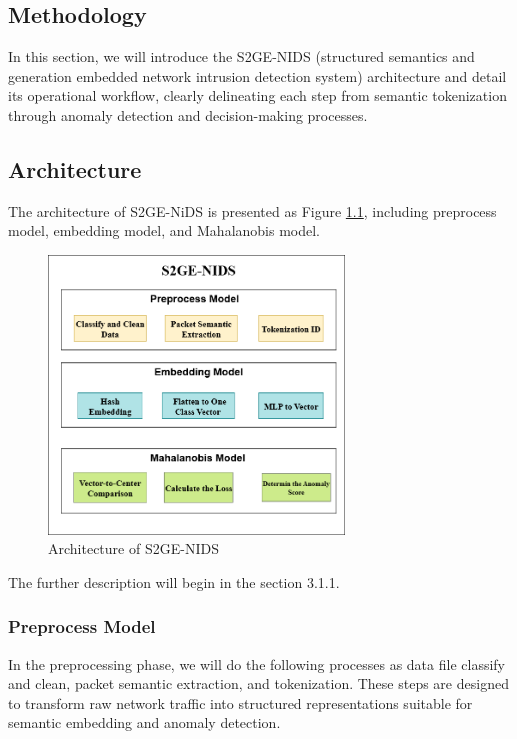 \begin{ZhChapter}

    \chapter{Methodology}
    In this section, we will introduce the S2GE-NIDS (structured semantics and generation embedded network intrusion detection system) architecture and detail its operational workflow, clearly delineating each step from semantic tokenization through anomaly detection and decision-making processes.
    \section{Architecture} %
    The architecture of S2GE-NiDS is presented as Figure \ref{fig:Architecture}, including preprocess model, embedding model, and Mahalanobis model.

    \begin{figure}[htbp]
        \centering
        \includegraphics[width = 0.7\textwidth]{image/architecture.png}
        \caption{Architecture of S2GE-NIDS}
        \label{fig:Architecture}
    \end{figure}

    The further description will begin in the section 3.1.1.

    \subsection{Preprocess Model}
    In the preprocessing phase, we will do the following processes as data file classify and clean, packet semantic extraction, and tokenization. These steps are designed to transform raw network traffic into structured representations suitable for semantic embedding and anomaly detection.


\end{ZhChapter}
